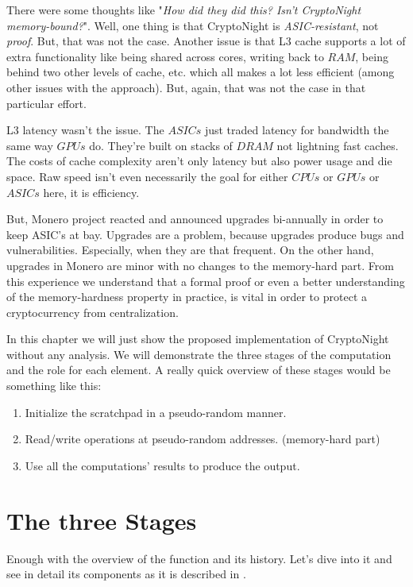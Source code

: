 There were some thoughts like "\emph{How did they did this? Isn't CryptoNight memory-bound?}". Well, one thing is that CryptoNight is \emph{ASIC-resistant}, not \emph{proof}. But, that was not the case. Another issue is that L3 cache supports a lot of extra functionality like being shared across cores, writing back to $RAM$, being behind two other levels of cache, etc. which all makes a lot less efficient (among other issues with the approach). But, again, that was not the case in that particular effort.

L3 latency wasn't the issue. The $ASICs$ just traded latency for bandwidth the same way $GPUs$ do. They're built on stacks of $DRAM$ not lightning fast caches. The costs of cache complexity aren't only latency but also power usage and die space. Raw speed isn't even necessarily the goal for either $CPUs$ or $GPUs$ or $ASICs$ here, it is efficiency.

But, Monero project reacted and announced upgrades bi-annually in order to keep ASIC's at bay. Upgrades are a problem, because upgrades produce bugs and vulnerabilities. Especially, when they are that frequent. On the other hand, upgrades in Monero are minor with no changes to the memory-hard part. From this experience we understand that a formal proof or even a better understanding of the memory-hardness property in practice, is vital in order to protect a cryptocurrency from centralization.

In this chapter we will just show the proposed implementation of CryptoNight without any analysis. We will demonstrate the three stages of the computation and the role for each element. A really quick overview of these stages would be something like this:

\begin{enumerate}
  \item Initialize the scratchpad in a pseudo-random manner.
  \item Read/write operations at pseudo-random addresses. (memory-hard part)
  \item Use all the computations' results to produce the output.
\end{enumerate}

\section{The three Stages}
Enough with the overview of the function and its history. Let's dive into it and see in detail its components as it is described in \cite{cryptonight}.

